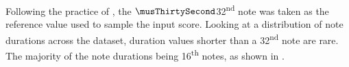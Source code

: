 
Following the practice of \textcite{micchi2020not}, the
$\musThirtySecond$32\textsuperscript{nd} note was taken as
the reference value used to sample the input score. Looking
at a distribution of note durations across the dataset,
duration values shorter than a 32\textsuperscript{nd} note
are rare. The majority of the note durations being
16\textsuperscript{th} notes, as shown in
.


